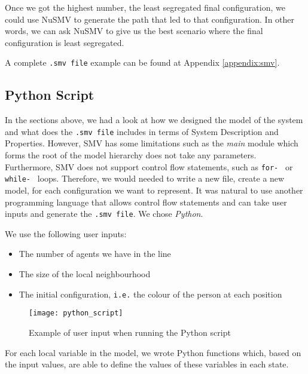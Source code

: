 \documentclass[../main.tex]{subfiles}
\begin{document}
Once we got the highest number, the least segregated final configuration, we could use NuSMV to generate the path that led to that configuration. In other words, we can ask NuSMV to give us the best scenario where the final configuration is least segregated.


A complete \verb|.smv file| example can be found at Appendix \ref{appendix:smv}.

\subsection{Python Script}
In the sections above, we had a look at how we designed the model of the system and what does the \verb|.smv file| includes in terms of System Description and Properties. However, SMV has some limitations such as the \textit{main} module which forms the root of the model hierarchy does not take any parameters. Furthermore, SMV does not support control flow statements, such as \verb|for- | or \verb|while- | loops. Therefore, we would needed to write a new file, create a new model, for each configuration we want to represent. It was natural to use another programming language that allows control flow statements and can take user inputs and generate the \verb|.smv file|. We chose \textit{Python}\cite[]{Python}.  

We use the following user inputs:
\begin{itemize}
    \item The number of agents we have in the line
    \item The size of the local neighbourhood 
    \item The initial configuration, \verb|i.e.| the colour of the person at each position
\end{itemize}

\begin{figure}[H]
\centering
\texttt{[image: python\_script]}
\caption{Example of user input when running the Python script}
\end{figure}

For each local variable in the model, we wrote Python functions which, based on the input values, are able to define the values of these variables in each state. 
\end{document}

